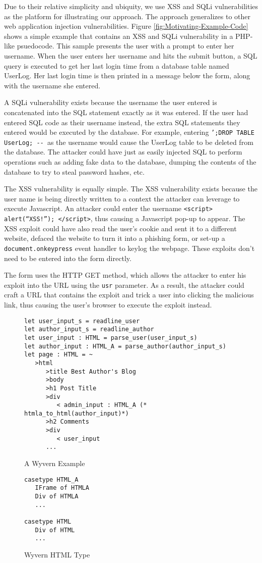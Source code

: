 Due to their relative simplicity and ubiquity, we use XSS and SQLi
vulnerabilities as the platform for illustrating our approach. The
approach generalizes to other web application injection vulnerabilities.
Figure \ref{fig:Motivating-Example-Code} shows a simple example that
contains an XSS and SQLi vulnerability in a PHP-like psuedocode. This
sample presents the user with a prompt to enter her username. When
the user enters her username and hits the submit button, a SQL query
is executed to get her last login time from a database table named
UserLog. Her last login time is then printed in a message below
the form, along with the username she entered. 

A SQLi vulnerability exists because the username the user entered
is concatenated into the SQL statement exactly as it was entered.
If the user had entered SQL code as their username instead, the extra
SQL statements they entered would be executed by the database. For
example, entering \texttt{';DROP TABLE UserLog; -{}- }as the username
would cause the UserLog table to be deleted from the database. The
attacker could have just as easily injected SQL to perform operations
such as adding fake data to the database, dumping the contents of
the database to try to steal password hashes, etc. 

The XSS vulnerability is equally simple.
The XSS vulnerability exists because the user name is being directly
written to a context the attacker can leverage to execute Javascript.
An attacker could enter the username \texttt{<script> alert(``XSS!''); </script>},
thus causing a Javascript pop-up to appear. The XSS exploit could
have also read the user's cookie and sent it to a different website,
defaced the website to turn it into a phishing form, or set-up a \texttt{document.onkeypress}
event handler to keylog the webpage. These exploits don't need to
be entered into the form directly.

The form uses the HTTP GET method, which allows the attacker to enter
his exploit into the URL using the \texttt{usr} parameter. As a
result, the attacker could craft a URL that contains the exploit and
trick a user into clicking the malicious link, thus causing the user's
browser to execute the exploit instead.


\begin{figure}
\begin{lstlisting}
let user_input_s = readline_user
let author_input_s = readline_author
let user_input : HTML = parse_user(user_input_s)
let author_input : HTML_A = parse_author(author_input_s)
let page : HTML = ~
   >html
      >title Best Author's Blog
      >body
      >h1 Post Title
      >div
         < admin_input : HTML_A (* htmla_to_html(author_input)*)
      >h2 Comments
      >div
         < user_input
      ... 
\end{lstlisting}
\caption{A Wyvern Example}
\label{fig:wyvern-example}
\end{figure}


\begin{figure}
\begin{lstlisting}
casetype HTML_A
   IFrame of HTMLA
   Div of HTMLA
   ...

casetype HTML
   Div of HTML
   ...
\end{lstlisting}
\caption{Wyvern HTML Type}
\label{fig:wyvern-example}
\end{figure}
